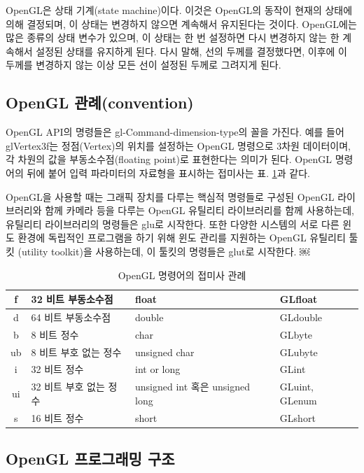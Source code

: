 OpenGL은 상태 기계(state machine)이다. 이것은 OpenGL의 동작이 현재의 상태에 의해 결정되며, 이 상태는 변경하지 않으면 계속해서 유지된다는 것이다.
OpenGL에는 많은 종류의 상태 변수가 있으며, 이 상태는 한 번 설정하면 다시 변경하지 않는 한 계속해서 설정된 상태를 유지하게 된다.
다시 말해, 선의 두께를 결정했다면, 이후에 이 두께를 변경하지 않는 이상 모든 선이 설정된 두께로 그려지게 된다.

\subsection{OpenGL 관례(convention)}

OpenGL API의 명령들은 gl-Command-dimension-type의 꼴을 가진다. 예를 들어 glVertex3f는 정점(Vertex)의 위치를 설정하는 OpenGL 명령으로 3차원 데이터이며, 각 차원의 값을 부동소수점(floating point)로 표현한다는 의미가 된다.
OpenGL 명령어의 뒤에 붙어 입력 파라미터의 자료형을 표시하는 접미사는 표. \ref{tab:OGL_opengl:convention}과 같다.

OpenGL을 사용할 때는 그래픽 장치를 다루는 핵심적 명령들로 구성된 OpenGL 라이브러리와 함께 카메라 등을 다루는 OpenGL 유틸리티 라이브러리를 함께 사용하는데, 유틸리티 라이브러리의 명령들은 glu로 시작한다. 또한 다양한 시스템의 서로 다른 윈도 환경에 독립적인 프로그램을 하기 위해 윈도 관리를 지원하는 OpenGL 유틸리티 툴킷 (utility toolkit)을 사용하는데, 이 툴킷의 명령들은 glut로 시작한다.
￼

\begin{table}
\begin{tabular}{|c|l|l|l|} \hline
f & 32 비트 부동소수점 & float & GLfloat \\ \hline
d & 64 비트 부동소수점 & double & GLdouble \\ \hline
b & 8 비트 정수 & char & GLbyte \\ \hline
ub & 8 비트 부호 없는 정수 & unsigned char & GLubyte \\ \hline
i & 32 비트 정수 & int or long & GLint \\ \hline
ui & 32 비트 부호 없는 정수  & unsigned int 혹은 unsigned long & GLuint, GLenum \\ \hline
s & 16 비트 정수 & short & GLshort \\ \hline
\end{tabular}
\caption{OpenGL 명령어의 접미사 관례}
\label{tab:OGL_opengl:convention}
\end{table}
\subsection{OpenGL 프로그래밍 구조}


